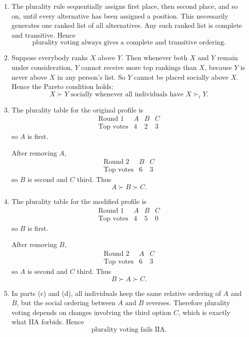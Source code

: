 \documentclass[12pt]{article}
\begin{document}
\begin{enumerate}[label=(\alph*)]
    \item
    The plurality rule sequentially assigns first place, then second place, and so on, until every alternative has been assigned a position. This necessarily generates one ranked list of all alternatives. Any such ranked list is complete and transitive. Hence
    \[
    \boxed{\text{plurality voting always gives a complete and transitive ordering.}}
    \]

    \item
    Suppose everybody ranks $X$ above $Y$. Then whenever both $X$ and $Y$ remain under consideration, $Y$ cannot receive more top rankings than $X$, because $Y$ is never above $X$ in any person's list. So $Y$ cannot be placed socially above $X$. Hence the Pareto condition holds:
    \[
    \boxed{X \succ Y \text{ socially whenever all individuals have } X \succ_i Y.}
    \]

    \item
    The plurality table for the original profile is
    \[
    \begin{array}{c|ccc}
    \text{Round 1} & A & B & C\\ \hline
    \text{Top votes} & 4 & 2 & 3
    \end{array}
    \]
    so $A$ is first.

    After removing $A$,
    \[
    \begin{array}{c|cc}
    \text{Round 2} & B & C\\ \hline
    \text{Top votes} & 6 & 3
    \end{array}
    \]
    so $B$ is second and $C$ third. Thus
    \[
    \boxed{A \succ B \succ C.}
    \]

    \item
    The plurality table for the modified profile is
    \[
    \begin{array}{c|ccc}
    \text{Round 1} & A & B & C\\ \hline
    \text{Top votes} & 4 & 5 & 0
    \end{array}
    \]
    so $B$ is first.

    After removing $B$,
    \[
    \begin{array}{c|cc}
    \text{Round 2} & A & C\\ \hline
    \text{Top votes} & 6 & 3
    \end{array}
    \]
    so $A$ is second and $C$ third. Thus
    \[
    \boxed{B \succ A \succ C.}
    \]

    \item
    In parts (c) and (d), all individuals keep the same relative ordering of $A$ and $B$, but the social ordering between $A$ and $B$ reverses. Therefore plurality voting depends on changes involving the third option $C$, which is exactly what IIA forbids. Hence
    \[
    \boxed{\text{plurality voting fails IIA.}}
    \]
\end{enumerate}
\end{document}

